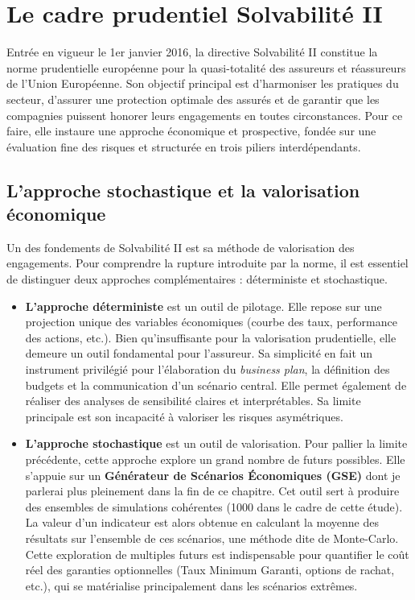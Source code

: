 \section{Le cadre prudentiel Solvabilité II}
\label{sec:s2}

Entrée en vigueur le 1er janvier 2016, la directive Solvabilité II constitue la norme prudentielle européenne pour la quasi-totalité des assureurs et réassureurs de l'Union Européenne. Son objectif principal est d'harmoniser les pratiques du secteur, d'assurer une protection optimale des assurés et de garantir que les compagnies puissent honorer leurs engagements en toutes circonstances. Pour ce faire, elle instaure une approche économique et prospective, fondée sur une évaluation fine des risques et structurée en trois piliers interdépendants.

\subsection{L'approche stochastique et la valorisation économique}

Un des fondements de Solvabilité II est sa méthode de valorisation des engagements. Pour comprendre la rupture introduite par la norme, il est essentiel de distinguer deux approches complémentaires : déterministe et stochastique.

\begin{itemize}
    \item \textbf{L'approche déterministe} est un outil de pilotage. Elle repose sur une projection unique des variables économiques (courbe des taux, performance des actions, etc.). Bien qu'insuffisante pour la valorisation prudentielle, elle demeure un outil fondamental pour l'assureur. Sa simplicité en fait un instrument privilégié pour l'élaboration du \textit{business plan}, la définition des budgets et la communication d'un scénario central. Elle permet également de réaliser des analyses de sensibilité claires et interprétables. Sa limite principale est son incapacité à valoriser les risques asymétriques.

    \item \textbf{L'approche stochastique} est un outil de valorisation. Pour pallier la limite précédente, cette approche explore un grand nombre de futurs possibles. Elle s'appuie sur un \textbf{Générateur de Scénarios Économiques (GSE)} dont je parlerai plus pleinement dans la fin de ce chapitre. Cet outil sert à produire des ensembles de simulations cohérentes (1000 dans le cadre de cette étude). La valeur d'un indicateur est alors obtenue en calculant la moyenne des résultats sur l'ensemble de ces scénarios, une méthode dite de Monte-Carlo. Cette exploration de multiples futurs est indispensable pour quantifier le coût réel des garanties optionnelles (Taux Minimum Garanti, options de rachat, etc.), qui se matérialise principalement dans les scénarios extrêmes.
\end{itemize}

